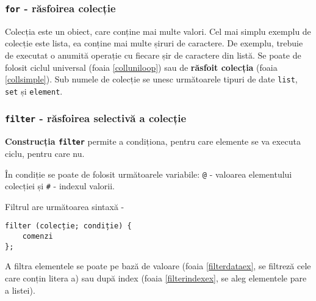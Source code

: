 \begin{sourcecode}
    \label{dowhileex}
    \inputminted[linenos]{icl}{../sources/dowhileex.icL}
\end{sourcecode}

\subsubsection{\texttt{for} - răsfoirea colecție}

{Colecția} este un obiect, care conține mai multe valori. Cel mai simplu exemplu de colecție este lista, ea conține mai multe șiruri de caractere. De exemplu, trebuie de executat o anumită operație cu fiecare șir de caractere din listă. Se poate de folosit ciclul universal (foaia \ref{colluniloop}) sau de {\bf răsfoit colecția} (foaia \ref{collsimple}). Sub numele de colecție se unesc următoarele tipuri de date \texttt{list}, \texttt{set} și \texttt{element}.

\subsubsection{\texttt{filter} - răsfoirea selectivă a colecție}

{\bf Construcția \texttt{filter}} permite a condiționa, pentru care elemente se va executa ciclu, pentru care nu.

În condiție se poate de folosit următoarele variabile: \texttt{@} - valoarea elementului colecției și \texttt{#} - indexul valorii.

Filtrul are următoarea sintaxă -
\begin{verbatim}
filter (colecție; condiție) {
	comenzi
};
\end{verbatim}

A filtra elementele se poate pe bază de valoare (foaia \ref{filterdataex}, se filtreză cele care conțin litera a) sau după index (foaia \ref{filterindexex}, se aleg elementele pare a listei).

\begin{sourcecode}
    \label{colluniloop}
    \inputminted[linenos]{icl}{../sources/colluniloop.icL}
\end{sourcecode}

\begin{sourcecode}
    \label{collsimple}
    \inputminted[linenos]{icl}{../sources/collsimple.icL}
\end{sourcecode}

